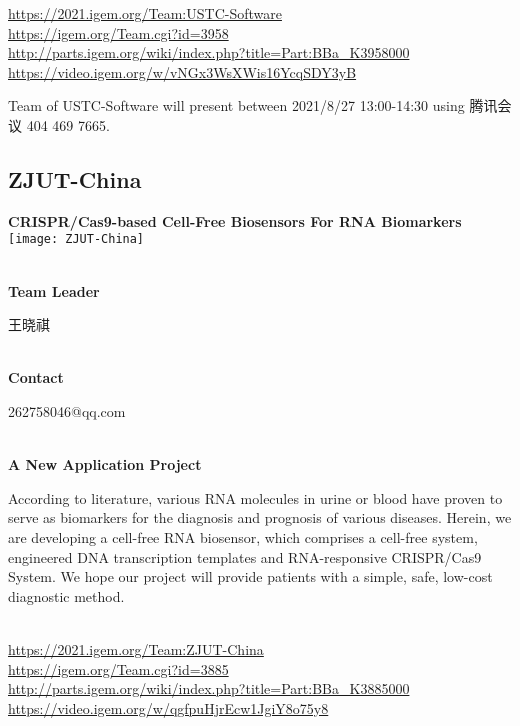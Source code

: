 \url{https://2021.igem.org/Team:USTC-Software }\\
\url{https://igem.org/Team.cgi?id=3958 }\\
\url{http://parts.igem.org/wiki/index.php?title=Part:BBa_K3958000 }\\
\url{https://video.igem.org/w/vNGx3WsXWis16YcqSDY3yB }\\

\vfill{}









Team of USTC-Software will present between 2021/8/27 13:00-14:30        using 腾讯会议 404 469 7665.
\newpage


\subsection{\textcolor{Blu}{ ZJUT-China } }
\vspace{5mm}
\begin{center}
\large{
  \textbf{ CRISPR/Cas9-based Cell-Free Biosensors For RNA Biomarkers }\\
  \texttt{[image: ZJUT-China]}
}
\end{center}
\textbf{\\Team Leader}

  王晓祺


\textbf{\\Contact}

  262758046@qq.com


\textbf{\\A New Application Project\\}\begin{spacing}{1.5}

According to literature, various RNA molecules in urine or blood have proven to serve as biomarkers for the diagnosis and prognosis of various diseases. Herein, we are developing a cell-free RNA biosensor, which comprises a cell-free system, engineered DNA transcription templates and RNA-responsive CRISPR/Cas9 System. We hope our project will provide patients with a simple, safe, low-cost diagnostic method.\end{spacing}
\\

\url{https://2021.igem.org/Team:ZJUT-China }\\
\url{https://igem.org/Team.cgi?id=3885 }\\
\url{http://parts.igem.org/wiki/index.php?title=Part:BBa_K3885000 }\\
\url{https://video.igem.org/w/qgfpuHjrEcw1JgiY8o75y8 }\\

